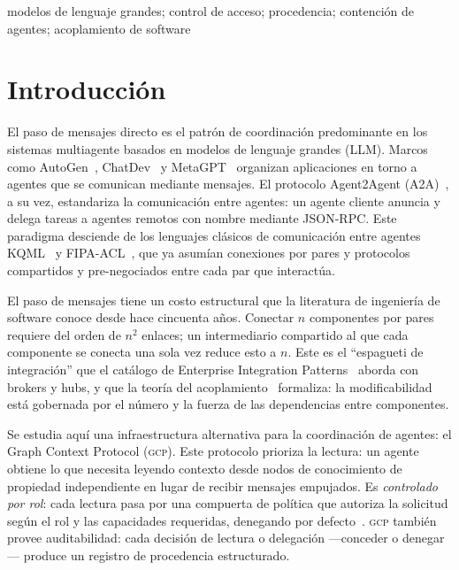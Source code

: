 \documentclass[conference,letterpaper]{IEEEtran}
\newcommand{\gcp}{\textsc{gcp}}
\begin{document}
\begin{IEEEkeywords}
modelos de lenguaje grandes; control de acceso; procedencia; contenci\'on de agentes; acoplamiento
de software
\end{IEEEkeywords}

\section{Introducci\'on}

El paso de mensajes directo es el patr\'on de coordinaci\'on predominante en los sistemas
multiagente basados en modelos de lenguaje grandes (LLM). Marcos como AutoGen~\citep{wu2023autogen},
ChatDev~\citep{qian2024chatdev} y MetaGPT~\citep{hong2024metagpt} organizan aplicaciones en torno a
agentes que se comunican mediante mensajes. El protocolo Agent2Agent (A2A)~\citep{a2a2025}, a su vez,
estandariza la comunicaci\'on entre agentes: un agente cliente anuncia y delega tareas a agentes
remotos con nombre mediante JSON-RPC. Este paradigma desciende de los lenguajes cl\'asicos de
comunicaci\'on entre agentes KQML~\citep{finin1994} y
FIPA-ACL~\citep{fipa2002}, que ya asum\'ian conexiones por pares y protocolos compartidos y
pre-negociados entre cada par que interact\'ua.

El paso de mensajes tiene un costo estructural que la literatura de ingenier\'ia de software conoce
desde hace cincuenta a\~nos. Conectar $n$ componentes por pares requiere del orden de $n^2$ enlaces;
un intermediario compartido al que cada componente se conecta una sola vez reduce esto a $n$. Este es
el ``espagueti de integraci\'on'' que el cat\'alogo de Enterprise Integration
Patterns~\citep{hohpe2003} aborda con brokers y hubs, y que la teor\'ia del
acoplamiento~\citep{parnas1972,stevens1974,briand1999} formaliza: la modificabilidad est\'a gobernada
por el n\'umero y la fuerza de las dependencias entre componentes.

Se estudia aqu\'i una infraestructura alternativa para la coordinaci\'on de agentes: el Graph Context
Protocol (\gcp{}). Este protocolo prioriza la lectura: un agente obtiene lo que necesita leyendo
contexto desde nodos de conocimiento de propiedad independiente en lugar de recibir mensajes
empujados. Es \emph{controlado por rol}: cada lectura pasa
por una compuerta de pol\'itica que autoriza la solicitud seg\'un el rol y las capacidades requeridas,
denegando por defecto~\citep{saltzer1975,sandhu1996}. \gcp{} tambi\'en provee auditabilidad: cada
decisi\'on de lectura o delegaci\'on ---conceder o denegar--- produce un registro de procedencia
estructurado.
\end{document}
